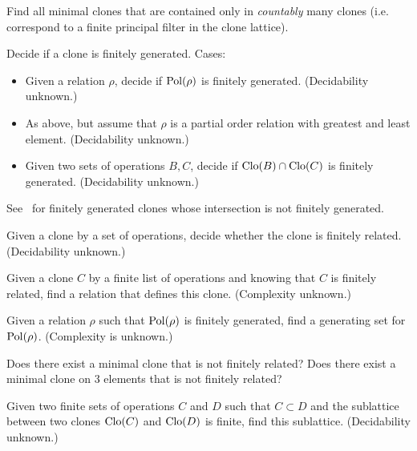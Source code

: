 \begin{question}
  Find all minimal clones that are contained only in \emph{countably} many clones (i.e.
  correspond to a finite principal filter in the clone lattice).
\end{question}

\begin{question}
  Decide if a clone is finitely generated. Cases:
  \begin{itemize}
    \item Given a relation $\rho$, decide if $\operatorname{Pol}(\rho)$ is finitely
      generated. (Decidability unknown.)
    \item As above, but assume that $\rho$ is a partial order relation with
      greatest and least element. (Decidability unknown.)
    \item Given two sets of operations $B, C$, decide if $\operatorname{Clo}(B)\cap \operatorname{Clo}(C)$
      is finitely generated. (Decidability unknown.)
  \end{itemize}
\end{question}
\begin{context}
  See~\cite{haddad} for finitely generated clones whose intersection is not
  finitely generated.
\end{context}

\begin{question}
Given a clone by a set of operations, decide whether the clone is finitely related. (Decidability unknown.) 
\end{question}

\begin{question}
Given a clone $C$ by a finite list of operations and knowing that $C$ is
finitely related, find a relation that defines this clone. (Complexity unknown.)
\end{question}
\begin{question}
  Given a relation $\rho$ such that $\operatorname{Pol}(\rho)$ is finitely generated, find
  a generating set for $\operatorname{Pol}(\rho)$. (Complexity is unknown.)
\end{question}

\begin{question}
  Does there exist a minimal clone that is not finitely related? Does 
  there exist a minimal clone on 3 elements that is not finitely
  related?
\end{question}

\begin{question}
  Given two finite sets of operations $C$ and $D$ such
  that $C\subset D$ and the sublattice between two clones
  $\operatorname{Clo}(C)$ and $\operatorname{Clo}(D)$ is finite, find this sublattice. (Decidability
  unknown.)
\end{question}

